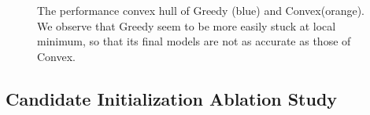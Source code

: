 \documentclass{article}
\begin{document}
\begin{figure}[t]
    \centering
    
    \caption{The performance convex hull of Greedy (blue) and Convex(orange). 
    We observe that Greedy seem to be more easily stuck at local minimum, 
    so that its final models are not as accurate as those of Convex.}
    \label{fig:perf_ch}
\end{figure}

\subsection{Candidate Initialization Ablation Study}
\label{sec:soft_vs_hard}
\end{document}
